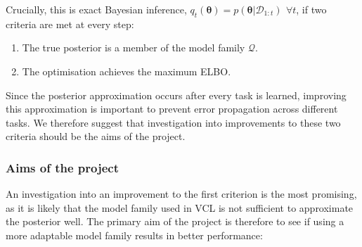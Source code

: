 \documentclass[a4paper,10pt]{article}
\let\boldtheta\theta %
\renewcommand{\theta}{\boldsymbol{\boldtheta}} %
\begin{document}
\vspace{-0.6em}
Crucially, this is exact Bayesian inference, $q_t(\theta)=p(\theta | \mathcal{D}_{1:t}) \>\, \forall t$, if two criteria are met at every step:

\begin{enumerate}
\item The true posterior is a member of the model family $\mathcal{Q}$.
\item The optimisation achieves the maximum ELBO.

\end{enumerate}

Since the posterior approximation occurs after every task is learned, improving this approximation is important to prevent error propagation across different tasks. We therefore suggest that investigation into improvements to these two criteria should be the aims of the project.

\vspace{-1em}
\subsubsection*{Aims of the project}

\vspace{-1em}
An investigation into an improvement to the first criterion is the most promising, as it is likely that the model family used in VCL is not sufficient to approximate the posterior well. The primary aim of the project is therefore to see if using a more adaptable model family results in better performance:
\end{document}
